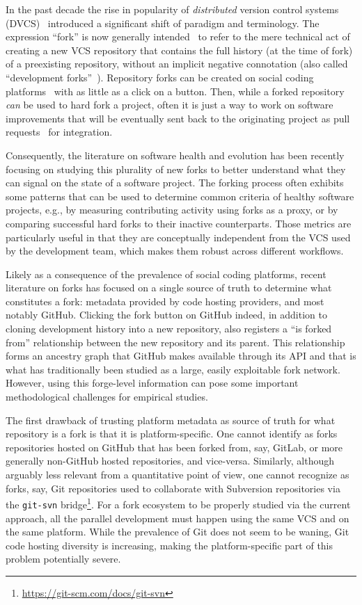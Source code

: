 In the past decade the rise in popularity of \emph{distributed} version control
systems (DVCS)~\cite{spinellis2005vcs} introduced a significant shift of
paradigm and terminology. The expression ``fork'' is now generally
intended~\cite{zhou2019fork} to refer to the mere technical act of creating a
new VCS repository that contains the full history (at the time of fork) of a
preexisting repository, without an implicit negative connotation (also called
``development forks''~\cite{fogel2005producingoss}). Repository forks can be
created on social coding platforms~\cite{dabbish2012socialcoding,
thung2013network} with as little as a click on a button. Then, while a forked
repository \emph{can} be used to hard fork a project, often it is just a way to
work on software improvements that will be eventually sent back to the
originating project as pull requests~\cite{gousios2014pullrequests} for
integration.

Consequently, the literature on software health and evolution has been
recently focusing on studying this plurality of new forks to better
understand what they can signal on the state of a software project. The
forking process often exhibits some patterns that can be used to determine
common criteria of healthy software projects, e.g., by measuring contributing
activity using forks as a proxy, or by comparing successful hard forks to
their inactive counterparts. Those metrics are particularly useful in that
they are conceptually independent from the VCS used by the development team,
which makes them robust across different workflows.

Likely as a consequence of the prevalence of social coding platforms, recent
literature on forks has focused on a single source of truth to determine what
constitutes a fork: metadata provided by code hosting providers, and most
notably GitHub. Clicking the fork button on GitHub indeed, in addition to
cloning development history into a new repository, also registers a ``is forked
from'' relationship between the new repository and its parent. This
relationship forms an ancestry graph that GitHub makes available through its
API and that is what has traditionally been studied as a large, easily
exploitable fork network. However, using this forge-level information can pose
some important methodological challenges for empirical studies.

The first drawback of trusting platform metadata as source of truth for what
repository is a fork is that it is platform-specific. One cannot identify as
forks repositories hosted on GitHub that has been forked from, say, GitLab, or
more generally non-GitHub hosted repositories, and vice-versa. Similarly,
although arguably less relevant from a quantitative point of view, one cannot
recognize as forks, say, Git repositories used to collaborate with Subversion
repositories via the \texttt{git-svn}
bridge\footnote{\url{https://git-scm.com/docs/git-svn}}. For a fork ecosystem
to be properly studied via the current approach, all the parallel development
must happen using the same VCS and on the same platform. While the prevalence
of Git does not seem to be waning, Git code hosting diversity is increasing,
making the platform-specific part of this problem potentially severe.

